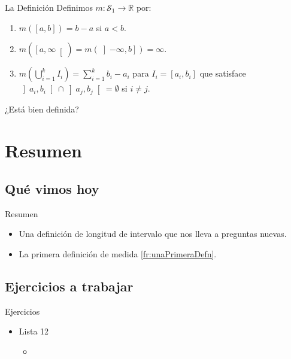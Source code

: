 \documentclass[utf8]{beamer}
\theoremstyle{plain}
\theoremstyle{definition}
\theoremstyle{remark}
\numberwithin{equation}{section}
\newcommand{\bR}{\mathbb{R}}    %
\newcommand{\cS}{\mathcal{S}}           %
\newcommand{\bonj}[1]{\left\lbrack#1\right\rbrack}
\newcommand{\obonj}[1]{\left\rbrack#1\right\lbrack}
\newcommand{\rbonj}[1]{\left\rbrack#1\right\rbrack}
\newcommand{\lbonj}[1]{\left\lbrack#1\right\lbrack}
\renewcommand{\.}{\Cdot}                %
\begin{document}
\begin{frame}{La Definición}\label{fr:unaPrimeraDefn}
  Definimos $m:\cS_1\to\bR$ por:
  \begin{enumerate}
    \item $m(\bonj{a,b})=b-a$ si $a<b$.
    \item $m(\lbonj{a,\infty})=m(\rbonj{-\infty,b})=\infty$.
    \item $m\left(\bigcup_{i=1}^k I_i\right)=\sum_{i=1}^kb_i-a_i$ para $I_i=[a_i,b_i]$ que satisface $\obonj{a_i,b_i}\cap\obonj{a_j,b_j}=\emptyset$ si $i\neq j$.
  \end{enumerate}
\end{frame}

\begin{frame}{¿Está bien definida?}
  
\end{frame}
\section*{Resumen}

\subsection*{Qu\'e vimos hoy}

\begin{frame}{Resumen}

  \begin{itemize}
  \item Una definición de longitud de intervalo que nos lleva a preguntas nuevas.
  \item La primera definición de medida \ref{fr:unaPrimeraDefn}.
  \end{itemize}
  
\end{frame}

\subsection*{Ejercicios a trabajar}
\begin{frame}{Ejercicios}
    
  \begin{itemize}
    \item
      Lista 12
      \begin{itemize}
      \item 
      \end{itemize}
    \end{itemize}
  
\end{frame}
\end{document}
